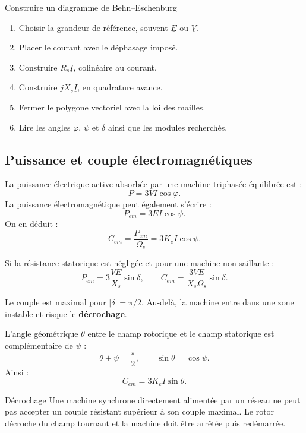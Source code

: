 \begin{TLMachineMethod}{Construire un diagramme de Behn--Eschenburg}
\begin{enumerate}
  \item Choisir la grandeur de référence, souvent $\underline E$ ou $\underline V$.
  \item Placer le courant avec le déphasage imposé.
  \item Construire $R_s\underline I$, colinéaire au courant.
  \item Construire $jX_s\underline I$, en quadrature avance.
  \item Fermer le polygone vectoriel avec la loi des mailles.
  \item Lire les angles $\varphi$, $\psi$ et $\delta$ ainsi que les modules recherchés.
\end{enumerate}
\end{TLMachineMethod}

\subsection{Puissance et couple électromagnétiques}

La puissance électrique active absorbée par une machine triphasée équilibrée est :
\[
P=3VI\cos\varphi.
\]
La puissance électromagnétique peut également s'écrire :
\[
\boxed{P_{em}=3EI\cos\psi.}
\]
On en déduit :
\[
\boxed{C_{em}=\frac{P_{em}}{\Omega_s}=3K_eI\cos\psi.}
\]

Si la résistance statorique est négligée et pour une machine non saillante :
\[
\boxed{P_{em}=3\frac{VE}{X_s}\sin\delta,}
\qquad
\boxed{C_{em}=\frac{3VE}{X_s\Omega_s}\sin\delta.}
\]

Le couple est maximal pour $|\delta|=\pi/2$. Au-delà, la machine entre dans une zone instable et risque le \textbf{décrochage}.

L'angle géométrique $\theta$ entre le champ rotorique et le champ statorique est complémentaire de $\psi$ :
\[
\theta+\psi=\frac{\pi}{2},
\qquad
\sin\theta=\cos\psi.
\]
Ainsi :
\[
C_{em}=3K_eI\sin\theta.
\]

\begin{TLMachineWarning}{Décrochage}
Une machine synchrone directement alimentée par un réseau ne peut pas accepter un couple résistant supérieur à son couple maximal. Le rotor décroche du champ tournant et la machine doit être arrêtée puis redémarrée.
\end{TLMachineWarning}

